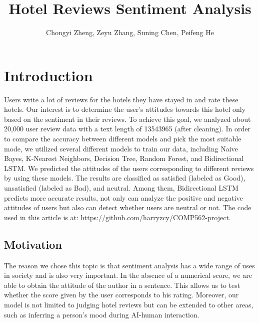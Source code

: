 \documentclass{article}
\title{Hotel Reviews Sentiment Analysis}
\author{Chongyi Zheng, Zeyu Zhang, Suning Chen, Peifeng He}
\begin{document}
\maketitle

\section{Introduction}

Users write a lot of reviews for the hotels they have stayed in and rate these hotels. Our interest is to determine the user's attitudes towards this hotel only based on the sentiment in their reviews. To achieve this goal, we analyzed about 20,000 user review data with a text length of 13543965 (after cleaning). In order to compare the accuracy between different models and pick the most suitable mode, we utilized several different models to train our data, including Naive Bayes, K-Nearest Neighbors, Decision Tree, Random Forest, and Bidirectional LSTM. We predicted the attitudes of the users corresponding to different reviews by using these models. The results are classified as satisfied (labeled as Good), unsatisfied (labeled as Bad), and neutral. Among them, Bidirectional LSTM predicts more accurate results, not only can analyze the positive and negative attitudes of users but also can detect whether users are neutral or not. The code used in this article is at: https://github.com/harryzcy/COMP562-project.

\subsection{Motivation}
The reason we chose this topic is that sentiment analysis has a wide range of uses in society and is also very important. In the absence of a numerical score, we are able to obtain the attitude of the author in a sentence. This allows us to test whether the score given by the user corresponds to his rating. Moreover, our model is not limited to judging hotel reviews but can be extended to other areas, such as inferring a person's mood during AI-human interaction.
\end{document}

